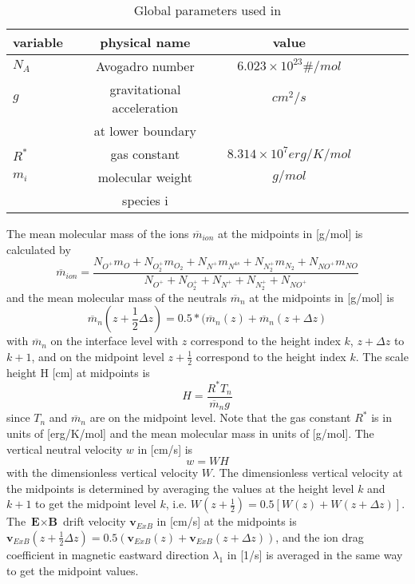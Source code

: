 %
\begin{table}[tb]
\begin{tabular}{|p{3.5cm} ||c|c|c|c|c|c|} \hline
variable               & physical name        & value \\ \hline
\hline
%
$N_A$   &  Avogadro number         & $6.023 \times 10^{23} \#/mol$  \\
$g$     &  gravitational acceleration                   & $cm^2/s$  \\
{}      &  at lower boundary  &   \\
$R^*$   &  gas constant       & $8.314 \times 10^{7} erg/K/mol$  \\
$m_{i}$ &  molecular weight         & $g/mol$ \\
        & species i         &
 \\ \hline
\end{tabular}
\caption{Global parameters used in }
\label{tab:parameters_qjoule_ti}
\end{table}
%
The mean molecular mass of the ions $\overline{m}_{ion}$ at the
midpoints in [g/mol] is calculated by
%
\begin{equation}
  \overline{m}_{ion}=\frac{N_{O^+} m_O+N_{O_2^+}m_{O_2}+N_{N^+}m_{N^{4s}}+
        N_{N_2^+}m_{N_2}+N_{NO^+}m_{NO}}
  {N_{O^+}+N_{O_2^+}+N_{N^+}+N_{N_2^+}+N_{NO^+}}
\end{equation}
%
and the mean molecular mass of the neutrals $\overline{m}_n$ at the
midpoints in [g/mol] is
%
\begin{equation}
 \overline{m}_{n}(z+\frac{1}{2} \Delta z) = 0.5*(\overline{m}_{n}(z)+\overline{m}_{n}(z+\Delta z)
\end{equation}
%
with $\overline{m}_n$ on the interface level with $z$ correspond to
the height index $k$, $z+\Delta z$ to $k+1$, and on the midpoint
level $z+\frac{1}{2}$ correspond to the height index $k$. The scale
height H [cm] at midpoints is
%
\begin{equation}
  H= \frac{R^* T_n}{\overline{m}_n g}
\end{equation}
%
since $T_n$ and $\overline{m}_n$ are on the midpoint level. Note
that the gas constant $R^*$ is in units of [erg/K/mol] and the mean
molecular mass in units of [g/mol]. The vertical neutral velocity
$w$ in [cm/s] is
%
\begin{equation}
  w = W H
\end{equation}
%
with the dimensionless vertical velocity $W$. The dimensionless
vertical velocity at the midpoints is determined by averaging the
values at the height level $k$ and $k+1$ to get the midpoint level
$k$, i.e. $W(z+\frac{1}{2}) = 0.5[W(z)+W(z+\Delta z)]$. The
$\textbf{E}\times \textbf{B}$ drift velocity $\textbf{v}_{ExB}$ in
[cm/s] at the midpoints is $\textbf{v}_{ExB}(z+\frac{1}{2}\Delta z)
= 0.5(\textbf{v}_{ExB}(z)+\textbf{v}_{ExB}(z+\Delta z))$, and the
ion drag coefficient in magnetic eastward direction $\lambda_1$ in
[1/s] is averaged in the same way to get the midpoint values. \\

